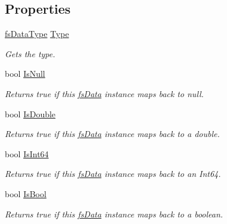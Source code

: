\subsection*{Properties}
\begin{DoxyCompactItemize}
\item 
\hyperlink{namespace_full_serializer_a6eee33d63b94e40fdfcfc59af9fcfc82}{fs\+Data\+Type} \hyperlink{class_full_serializer_1_1fs_data_a1103886f8029af3fb3e9adef1685072a}{Type}
\begin{DoxyCompactList}\small\item\em Gets the type. \end{DoxyCompactList}\item 
bool \hyperlink{class_full_serializer_1_1fs_data_af434698e3ebdea70932122c1b326c0a8}{Is\+Null}
\begin{DoxyCompactList}\small\item\em Returns true if this \hyperlink{class_full_serializer_1_1fs_data}{fs\+Data} instance maps back to null. \end{DoxyCompactList}\item 
bool \hyperlink{class_full_serializer_1_1fs_data_a346ac35da58a28836daed508ecf32b3f}{Is\+Double}
\begin{DoxyCompactList}\small\item\em Returns true if this \hyperlink{class_full_serializer_1_1fs_data}{fs\+Data} instance maps back to a double. \end{DoxyCompactList}\item 
bool \hyperlink{class_full_serializer_1_1fs_data_a80a85a78dda84fe0c68f7a163355e8c1}{Is\+Int64}
\begin{DoxyCompactList}\small\item\em Returns true if this \hyperlink{class_full_serializer_1_1fs_data}{fs\+Data} instance maps back to an Int64. \end{DoxyCompactList}\item 
bool \hyperlink{class_full_serializer_1_1fs_data_a0150291174c11e0880aee949b14c8741}{Is\+Bool}
\begin{DoxyCompactList}\small\item\em Returns true if this \hyperlink{class_full_serializer_1_1fs_data}{fs\+Data} instance maps back to a boolean. \end{DoxyCompactList}\item 

\end{DoxyCompactItemize}
